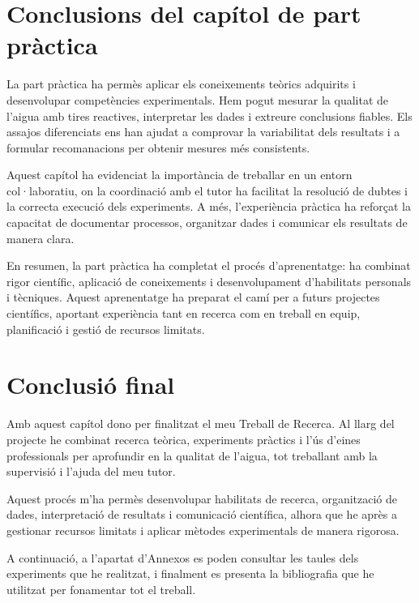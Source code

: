 \section{Conclusions del capítol de part pràctica}

La part pràctica ha permès aplicar els coneixements teòrics adquirits i desenvolupar competències experimentals. Hem pogut mesurar la qualitat de l’aigua amb tires reactives, interpretar les dades i extreure conclusions fiables. Els assajos diferenciats ens han ajudat a comprovar la variabilitat dels resultats i a formular recomanacions per obtenir mesures més consistents.

Aquest capítol ha evidenciat la importància de treballar en un entorn col·laboratiu, on la coordinació amb el tutor ha facilitat la resolució de dubtes i la correcta execució dels experiments. A més, l’experiència pràctica ha reforçat la capacitat de documentar processos, organitzar dades i comunicar els resultats de manera clara.

En resumen, la part pràctica ha completat el procés d’aprenentatge: ha combinat rigor científic, aplicació de coneixements i desenvolupament d’habilitats personals i tècniques. Aquest aprenentatge ha preparat el camí per a futurs projectes científics, aportant experiència tant en recerca com en treball en equip, planificació i gestió de recursos limitats.

\section{Conclusió final}
Amb aquest capítol dono per finalitzat el meu Treball de Recerca. Al llarg del projecte he combinat recerca teòrica, experiments pràctics i l’ús d’eines professionals per aprofundir en la qualitat de l’aigua, tot treballant amb la supervisió i l’ajuda del meu tutor.

Aquest procés m’ha permès desenvolupar habilitats de recerca, organització de dades, interpretació de resultats i comunicació científica, alhora que he après a gestionar recursos limitats i aplicar mètodes experimentals de manera rigorosa.

A continuació, a l’apartat d’Annexos es poden consultar les taules dels experiments que he realitzat, i finalment es presenta la bibliografia que he utilitzat per fonamentar tot el treball.

